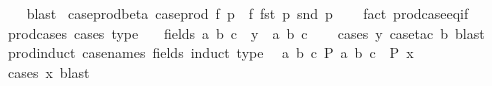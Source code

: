 \begin{isabellebody}
%
\isadelimproof
\ \ %
\endisadelimproof
%
\isatagproof
{}\isamarkupfalse%
\ blast%
\endisatagproof
{\isafoldproof}%
%
\isadelimproof
\isanewline
%
\endisadelimproof
\isanewline
\isanewline
\isanewline
{}\isamarkupfalse%
\ case{\isacharunderscore}{\kern0pt}prod{\isacharunderscore}{\kern0pt}beta{\isacharcolon}{\kern0pt}\ {\isachardoublequoteopen}case{\isacharunderscore}{\kern0pt}prod\ f\ p\ {\isacharequal}{\kern0pt}\ f\ {\isacharparenleft}{\kern0pt}fst\ p{\isacharparenright}{\kern0pt}\ {\isacharparenleft}{\kern0pt}snd\ p{\isacharparenright}{\kern0pt}{\isachardoublequoteclose}\isanewline
%
\isadelimproof
\ \ %
\endisadelimproof
%
\isatagproof
{}\isamarkupfalse%
\ {\isacharparenleft}{\kern0pt}fact\ prod{\isachardot}{\kern0pt}case{\isacharunderscore}{\kern0pt}eq{\isacharunderscore}{\kern0pt}if{\isacharparenright}{\kern0pt}%
\endisatagproof
{\isafoldproof}%
%
\isadelimproof
\isanewline
%
\endisadelimproof
\isanewline
{}\isamarkupfalse%
\ prod{\isacharunderscore}{\kern0pt}cases{}\ {\isacharbrackleft}{\kern0pt}cases\ type{\isacharbrackright}{\kern0pt}{\isacharcolon}{\kern0pt}\isanewline
\ \ \ {\isacharparenleft}{\kern0pt}fields{\isacharparenright}{\kern0pt}\ a\ b\ c\ \ {\isachardoublequoteopen}y\ {\isacharequal}{\kern0pt}\ {\isacharparenleft}{\kern0pt}a{\isacharcomma}{\kern0pt}\ b{\isacharcomma}{\kern0pt}\ c{\isacharparenright}{\kern0pt}{\isachardoublequoteclose}\isanewline
%
\isadelimproof
\ \ %
\endisadelimproof
%
\isatagproof
{}\isamarkupfalse%
\ {\isacharparenleft}{\kern0pt}cases\ y{\isacharcomma}{\kern0pt}\ case{\isacharunderscore}{\kern0pt}tac\ b{\isacharparenright}{\kern0pt}\ blast%
\endisatagproof
{\isafoldproof}%
%
\isadelimproof
\isanewline
%
\endisadelimproof
\isanewline
{}\isamarkupfalse%
\ prod{\isacharunderscore}{\kern0pt}induct{}\ {\isacharbrackleft}{\kern0pt}case{\isacharunderscore}{\kern0pt}names\ fields{\isacharcomma}{\kern0pt}\ induct\ type{\isacharbrackright}{\kern0pt}{\isacharcolon}{\kern0pt}\isanewline
\ \ {\isachardoublequoteopen}{\isacharparenleft}{\kern0pt}{\isasymAnd}a\ b\ c{\isachardot}{\kern0pt}\ P\ {\isacharparenleft}{\kern0pt}a{\isacharcomma}{\kern0pt}\ b{\isacharcomma}{\kern0pt}\ c{\isacharparenright}{\kern0pt}{\isacharparenright}{\kern0pt}\ {\isasymLongrightarrow}\ P\ x{\isachardoublequoteclose}\isanewline
%
\isadelimproof
\ \ %
\endisadelimproof
%
\isatagproof
{}\isamarkupfalse%
\ {\isacharparenleft}{\kern0pt}cases\ x{\isacharparenright}{\kern0pt}\ blast%
\endisatagproof

\end{isabellebody}
